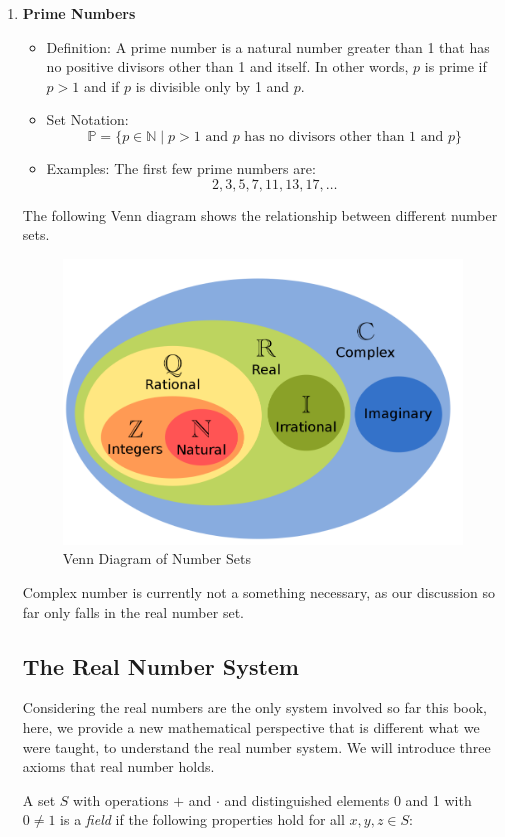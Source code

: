 \documentclass[
	12pt, %
	fleqn, %
	a4paper, %
]{LegrandOrangeBook}
\begin{document}
\begin{enumerate}
  \item \textbf{Prime Numbers}
\begin{itemize}
  \item Definition: A prime number is a natural number greater than 1 that has no positive divisors other than 1 and itself. In other words, \( p \) is prime if \( p > 1 \) and if \( p \) is divisible only by 1 and \( p \).
  \item Set Notation:
  \[
  \mathbb{P} = \{p \in \mathbb{N} \mid p > 1 \text{ and } p \text{ has no divisors other than } 1 \text{ and } p\}
  \]
  \item Examples: The first few prime numbers are:
  \[
  2, 3, 5, 7, 11, 13, 17, \ldots
  \]
\end{itemize}
The following Venn diagram shows the relationship between different number sets.
\begin{figure}[H]
    \centering
    \includegraphics[width=0.5\linewidth]{venn.png}
    \caption{Venn Diagram of Number Sets}
    \label{venn}
\end{figure}

\begin{remark}
    Complex number is currently not a something necessary, as our discussion so far only falls in the real number set.
\end{remark}

\subsection{The Real Number System}
Considering the real numbers are the only system involved so far this book, here, we provide a new mathematical perspective that is different what we were taught, to understand the real number system. We will introduce three axioms that real number holds.
\begin{definition}\label{axi:field}
A set \( S \) with operations \( + \) and \( \cdot \) and distinguished elements 0 and 1 with \( 0 \neq 1 \) is a \emph{field} if the following properties hold for all \( x, y, z \in S \):


\end{definition}
\end{enumerate}
\end{document}

